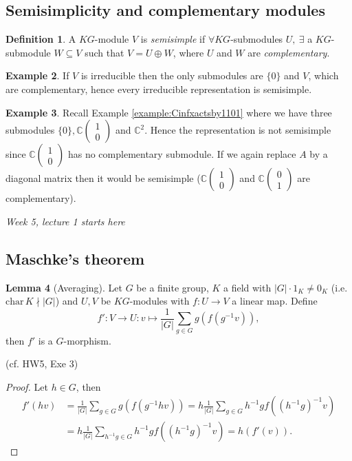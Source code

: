 \documentclass[a4paper]{article}
\newcommand{\Char}{\text{char}\,}
\newcommand{\C}{\mathbb{C}}
\theoremstyle{definition}
\newtheorem{defn}{Definition}[subsection]
\newtheorem{lemma}[defn]{Lemma}
\newtheorem{example}[defn]{Example}
\begin{document}
\subsection{Semisimplicity and complementary modules}
\begin{defn}
A $KG$-module $V$ is \textit{semisimple} if $\forall KG$-submodules $U,\ \exists$ a $KG$-submodule $W\subseteq V$ such that $V=U\oplus W$, where $U$ and $W$ are \textit{complementary}. 
\end{defn}

\begin{example}
If $V$ is irreducible then the only submodules are $\{0\}$ and $V$, which are complementary, hence every irreducible representation is semisimple.
\end{example}

\begin{example}
Recall Example \ref{example:Cinfxactsby1101} where we have three submodules $\{0\},\C\begin{pmatrix}1\\0\end{pmatrix}$ and $\C^2$. Hence the representation is not semisimple since $\C\begin{pmatrix}1\\0\end{pmatrix}$ has no complementary submodule. If we again replace $A$ by a diagonal matrix then it would be semisimple ($\C\begin{pmatrix}1\\0\end{pmatrix}$ and $\C\begin{pmatrix}0\\1\end{pmatrix}$ are complementary).
\end{example}

\begin{flushright}
\textit{Week 5, lecture 1 starts here}
\end{flushright}

\subsection{Maschke's theorem}
\begin{lemma}[Averaging]
Let $G$ be a finite group, $K$ a field with $|G|\cdot 1_K\neq 0_K$ (i.e. $\Char K\nmid |G|$) and $U,V$ be $KG$-modules with $f:U\rightarrow V$ a linear map. Define
\[
f':V\rightarrow U:v\mapsto \frac{1}{|G|}\sum_{g\in G} g\left(f\left(g^{-1}v\right)\right),
\]
then $f'$ is a $G$-morphism.

(cf. HW5, Exe 3)
\end{lemma}
\begin{proof}
Let $h\in G$, then
\[
\begin{aligned}
f'(hv)&=\frac{1}{|G|}\sum_{g\in G} g\left(f\left(g^{-1}hv\right)\right)=h\frac{1}{|G|}\sum_{g\in G} h^{-1} gf\left(\left(h^{-1}g\right)^{-1}v\right)\\
&=h\frac{1}{|G|}\sum_{h^{-1}g\in G} h^{-1} gf\left(\left(h^{-1}g\right)^{-1}v\right)=h(f'(v)).
\end{aligned}
\]
\end{proof}
\end{document}
